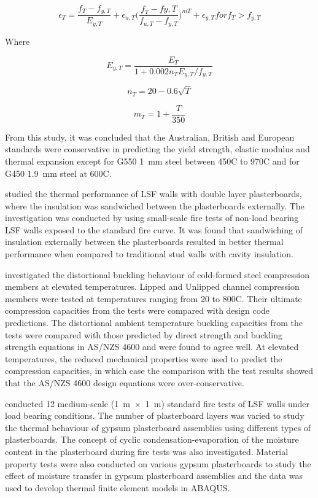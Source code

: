 \begin{equation}
\epsilon_T = \dfrac{f_T-f_{y,T}}{E_{y,T}}+\epsilon_{u,T}\big(\dfrac{f_T-f{y,T}}{f_{u,T}-f_{y,T}}\big)^{mT} + \epsilon_{y,T} for f_T > f_{y,T}
\end{equation}

Where

\begin{equation}
E_{y,T} = \dfrac{E_T}{1+0.002n_TE_{y,T}/f_{y,T}}
\end{equation}

\begin{equation}
n_T = 20-0.6\sqrt{T}
\end{equation}

\begin{equation}
m_T = 1+\dfrac{T}{350}
\end{equation}


From this study, it was concluded that the Australian, British and European standards were conservative in predicting the yield strength, elastic modulus and thermal expansion except for G550 1~mm steel between 450\degree C to 970\degree C and for G450 1.9~mm steel at 600\degree C. 

\citet{Kolarkar2008} studied the thermal performance of LSF walls with double layer plasterboards, where the insulation was sandwiched between the plasterboards externally. The investigation was conducted by using small-scale fire tests of non-load bearing LSF walls exposed to the standard fire curve. It was found that sandwiching of insulation externally between the plasterboards resulted in better thermal performance when compared to traditional stud walls with cavity insulation. 

\citet{Ranawaka2009} investigated the distortional buckling behaviour of cold-formed steel compression members at elevated temperatures. Lipped and Unlipped channel compression members were tested at temperatures ranging from 20 to 800\degree C. Their ultimate compression capacities from the tests were compared with design code predictions. The distortional ambient temperature buckling capacities from the tests were compared with those predicted by direct strength and buckling strength equations in AS/NZS 4600 and were found to agree well. At elevated temperatures, the reduced mechanical properties were used to predict the compression capacities, in which case the comparison with the test results showed that the AS/NZS 4600 design equations were over-conservative.

\citet{Rahmanian2011} conducted 12 medium-scale (1~m~$\times$~1~m) standard fire tests of LSF walls under load bearing conditions. The number of plasterboard layers was varied to study the thermal behaviour of gypsum plasterboard assemblies using different types of plasterboards. The concept of cyclic condensation-evaporation of the moisture content in the plasterboard during fire tests was also investigated. Material property tests were also conducted on various gypsum plasterboards to study the effect of moisture transfer in gypsum plasterboard assemblies and the data was used to develop thermal finite element models in ABAQUS. 

